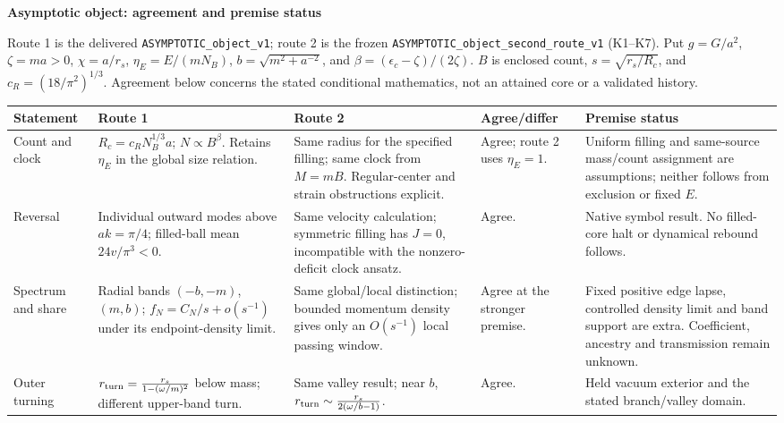 \documentclass[10pt]{article}
\begin{document}
\pagestyle{empty}
\noindent\textbf{Asymptotic object: agreement and premise status}

\small
Route 1 is the delivered \texttt{ASYMPTOTIC\_object\_v1};
route 2 is the frozen \texttt{ASYMPTOTIC\_object\_second\_route\_v1}
(K1--K7). Put \(g=G/a^2\), \(\zeta=ma>0\), \(\chi=a/r_s\),
\(\eta_E=E/(mN_B)\), \(b=\sqrt{m^2+a^{-2}}\), and
\(\beta=(\epsilon_c-\zeta)/(2\zeta)\).
\(B\) is enclosed count, \(s=\sqrt{r_s/R_c}\), and
\(c_R=(18/\pi^2)^{1/3}\).
Agreement below concerns the stated conditional mathematics, not an
attained core or a validated history.

\setlength{\tabcolsep}{3pt}
\renewcommand{\arraystretch}{1.13}
\noindent\begin{tabularx}{\textwidth}{@{}>{\raggedright\arraybackslash}p{}
 >{\raggedright\arraybackslash}X >{\raggedright\arraybackslash}X
 >{\raggedright\arraybackslash}p{}
 >{\raggedright\arraybackslash}p{}@{}}
\hline
\textbf{Statement}&\textbf{Route 1}&\textbf{Route 2}&
\textbf{Agree/}\newline\textbf{differ}&\textbf{Premise status}\\ \hline
Count and clock&
\(R_c=c_RN_B^{1/3}a\); \(N\propto B^\beta\).
Retains \(\eta_E\) in the global size relation.&
Same radius for the specified filling; same clock from
\(M=mB\). Regular-center and strain obstructions explicit.&
Agree; route 2 uses \(\eta_E=1\).&
Uniform filling and same-source mass/count assignment are assumptions;
neither follows from exclusion or fixed \(E\).\\ \hline
Reversal&
Individual outward modes above \(ak=\pi/4\);
filled-ball mean \(24v/\pi^3<0\).&
Same velocity calculation; symmetric filling has \(J=0\),
incompatible with the nonzero-deficit clock ansatz.&
Agree.&
Native symbol result. No filled-core halt or dynamical rebound follows.\\ \hline
Spectrum and share&
Radial bands \((-b,-m)\), \((m,b)\);
\(f_N=C_N/s+o(s^{-1})\) under its endpoint-density limit.&
Same global/local distinction; bounded momentum density gives
only an \(O(s^{-1})\) local passing window.&
Agree at the stronger premise.&
Fixed positive edge lapse, controlled density limit and band support
are extra. Coefficient, ancestry and transmission remain unknown.\\ \hline
Outer turning&
\(r_{\rm turn}=\frac{r_s}{1-(\omega/m)^2}\) below mass;
different upper-band turn.&
Same valley result; near \(b\),
\(r_{\rm turn}\sim\frac{r_s}{2(\omega/b-1)}\).&
Agree.&
Held vacuum exterior and the stated branch/valley domain.

\end{tabularx}
\end{document}
